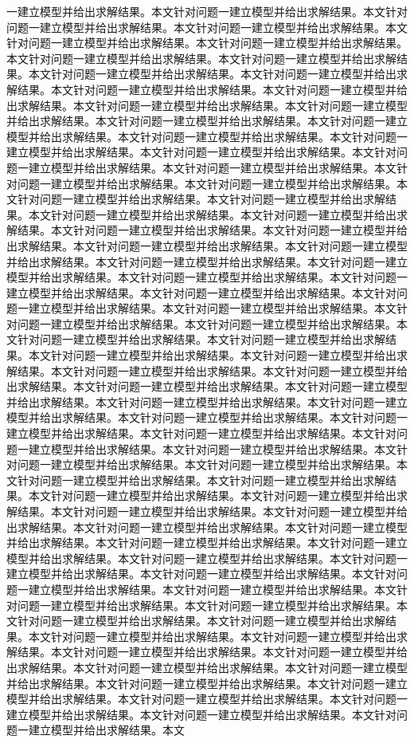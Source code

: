一建立模型并给出求解结果。本文针对问题一建立模型并给出求解结果。本文针对问题一建立模型并给出求解结果。本文针对问题一建立模型并给出求解结果。本文针对问题一建立模型并给出求解结果。本文针对问题一建立模型并给出求解结果。本文针对问题一建立模型并给出求解结果。本文针对问题一建立模型并给出求解结果。本文针对问题一建立模型并给出求解结果。本文针对问题一建立模型并给出求解结果。本文针对问题一建立模型并给出求解结果。本文针对问题一建立模型并给出求解结果。本文针对问题一建立模型并给出求解结果。本文针对问题一建立模型并给出求解结果。本文针对问题一建立模型并给出求解结果。本文针对问题一建立模型并给出求解结果。本文针对问题一建立模型并给出求解结果。本文针对问题一建立模型并给出求解结果。本文针对问题一建立模型并给出求解结果。本文针对问题一建立模型并给出求解结果。本文针对问题一建立模型并给出求解结果。本文针对问题一建立模型并给出求解结果。本文针对问题一建立模型并给出求解结果。本文针对问题一建立模型并给出求解结果。本文针对问题一建立模型并给出求解结果。本文针对问题一建立模型并给出求解结果。本文针对问题一建立模型并给出求解结果。本文针对问题一建立模型并给出求解结果。本文针对问题一建立模型并给出求解结果。本文针对问题一建立模型并给出求解结果。本文针对问题一建立模型并给出求解结果。本文针对问题一建立模型并给出求解结果。本文针对问题一建立模型并给出求解结果。本文针对问题一建立模型并给出求解结果。本文针对问题一建立模型并给出求解结果。本文针对问题一建立模型并给出求解结果。本文针对问题一建立模型并给出求解结果。本文针对问题一建立模型并给出求解结果。本文针对问题一建立模型并给出求解结果。本文针对问题一建立模型并给出求解结果。本文针对问题一建立模型并给出求解结果。本文针对问题一建立模型并给出求解结果。本文针对问题一建立模型并给出求解结果。本文针对问题一建立模型并给出求解结果。本文针对问题一建立模型并给出求解结果。本文针对问题一建立模型并给出求解结果。本文针对问题一建立模型并给出求解结果。本文针对问题一建立模型并给出求解结果。本文针对问题一建立模型并给出求解结果。本文针对问题一建立模型并给出求解结果。本文针对问题一建立模型并给出求解结果。本文针对问题一建立模型并给出求解结果。本文针对问题一建立模型并给出求解结果。本文针对问题一建立模型并给出求解结果。本文针对问题一建立模型并给出求解结果。本文针对问题一建立模型并给出求解结果。本文针对问题一建立模型并给出求解结果。本文针对问题一建立模型并给出求解结果。本文针对问题一建立模型并给出求解结果。本文针对问题一建立模型并给出求解结果。本文针对问题一建立模型并给出求解结果。本文针对问题一建立模型并给出求解结果。本文针对问题一建立模型并给出求解结果。本文针对问题一建立模型并给出求解结果。本文针对问题一建立模型并给出求解结果。本文针对问题一建立模型并给出求解结果。本文针对问题一建立模型并给出求解结果。本文针对问题一建立模型并给出求解结果。本文针对问题一建立模型并给出求解结果。本文针对问题一建立模型并给出求解结果。本文针对问题一建立模型并给出求解结果。本文针对问题一建立模型并给出求解结果。本文针对问题一建立模型并给出求解结果。本文针对问题一建立模型并给出求解结果。本文针对问题一建立模型并给出求解结果。本文针对问题一建立模型并给出求解结果。本文针对问题一建立模型并给出求解结果。本文针对问题一建立模型并给出求解结果。本文针对问题一建立模型并给出求解结果。本文针对问题一建立模型并给出求解结果。本文针对问题一建立模型并给出求解结果。本文针对问题一建立模型并给出求解结果。本文针对问题一建立模型并给出求解结果。本文针对问题一建立模型并给出求解结果。本文针对问题一建立模型并给出求解结果。本文针对问题一建立模型并给出求解结果。本文针对问题一建立模型并给出求解结果。本文针对问题一建立模型并给出求解结果。本文
